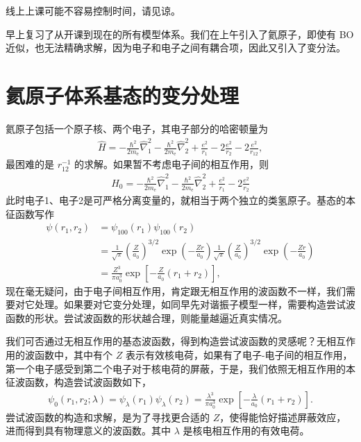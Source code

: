 线上上课可能不容易控制时间，请见谅。

早上复习了从开课到现在的所有模型体系。我们在上午引入了氦原子，即使有 BO 近似，也无法精确求解，因为电子和电子之间有耦合项，因此又引入了变分法。

\section{氦原子体系基态的变分处理}
氦原子包括一个原子核、两个电子，其电子部分的哈密顿量为
\begin{align}
    \hat H = -\frac{\hbar^2}{2m_{\mathrm{e}}} \hat\nabla_1^2 -\frac{\hbar^2}{2m_{\mathrm{e}}} \hat\nabla_2^2
    + \frac{e^2}{r_1} - 2\frac{e^2}{r_2} - 2\frac{e^2}{r_{12}},
\end{align}
最困难的是 $r_{12}^{-1}$ 的求解。如果暂不考虑电子间的相互作用，则
\begin{align}
    H_0 = -\frac{\hbar^2}{2m_{\mathrm{e}}} \hat\nabla_1^2 -\frac{\hbar^2}{2m_{\mathrm{e}}} \hat\nabla_2^2
    + \frac{e^2}{r_1} - 2\frac{e^2}{r_2}
\end{align}
此时电子1、电子2是可严格分离变量的，就相当于两个独立的类氢原子。基态的本征函数写作
\begin{align}
    \psi(r_1, r_2) &= \psi_{100}(r_1) \psi_{100}(r_2) \\
    &= \frac1{\sqrt{\pi}} \left(\frac{Z}{a_0}\right)^{3/2} \exp\!\left(-\frac{Zr}{a_0}\right) \frac1{\sqrt\pi} \left(\frac{Z}{a_0}\right)^{3/2} 
    \exp\!\left(-\frac{Zr}{a_0}\right) \\
    &= \frac{Z^3}{\pi a_0^3} \exp\!\left[-\frac Z{a_0}(r_1 + r_2)\right],
\end{align}
现在毫无疑问，由于电子间相互作用，肯定跟无相互作用的波函数不一样，我们需要对它处理。如果要对它变分处理，如同早先对谐振子模型一样，需要构造尝试波函数的形状。尝试波函数的形状越合理，则能量越逼近真实情况。

我们可否通过无相互作用的基态波函数，得到构造尝试波函数的灵感呢？无相互作用的波函数中，其中有个 $Z$ 表示有效核电荷，如果有了电子-电子间的相互作用，第一个电子感受到第二个电子对于核电荷的屏蔽，于是，我们依照无相互作用的本征波函数，构造尝试波函数如下，
\begin{align}
    \psi_0(r_1, r_2; \lambda) = \psi_\lambda (r_1) \psi_\lambda(r_2) =  \frac{\lambda^3}{\pi a_0^3} \exp\!\left[-\frac \lambda{a_0}(r_1 + r_2)\right]. \label{eq:he_trial}
\end{align}
尝试波函数的构造和求解，是为了寻找更合适的 $Z$，使得能恰好描述屏蔽效应，进而得到具有物理意义的波函数。其中 $\lambda$ 是核电相互作用的有效电荷。

